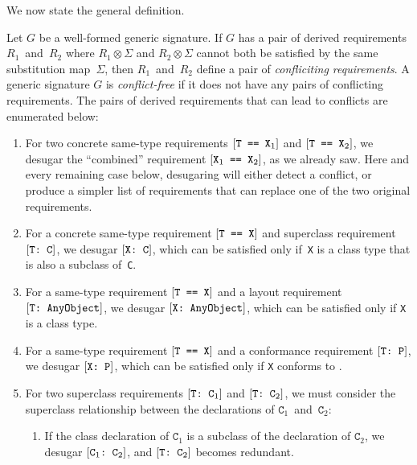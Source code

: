 \documentclass[../generics]{subfiles}
\begin{document}
We now state the general definition.

\begin{definition}\label{conflicting req def}
Let $G$ be a well-formed generic signature. If $G$ has a pair of derived requirements $R_1$~and~$R_2$ where $R_1\otimes\Sigma$ and $R_2\otimes\Sigma$ cannot both be satisfied by the same substitution map~$\Sigma$, then $R_1$~and~$R_2$ define a pair of \emph{confliciting requirements}. A generic signature $G$ is \emph{conflict-free} if it does not have any pairs of conflicting requirements. The pairs of derived requirements that can lead to conflicts are enumerated below:
\begin{enumerate}
\item For two concrete same-type requirements $[\texttt{T == $\texttt{X}_1$}]$ and $[\texttt{T == $\texttt{X}_2$}]$, we desugar the ``combined'' requirement $[\texttt{$\texttt{X}_1$ == $\texttt{X}_2$}]$, as we already saw. Here and every remaining case below, desugaring will either detect a conflict, or produce a simpler list of requirements that can replace one of the two original requirements.
\item For a concrete same-type requirement $[\texttt{T == X}]$ and superclass requirement $[\texttt{T:~C}]$, we desugar $[\texttt{X:~C}]$, which can be satisfied only if~\texttt{X} is a class type that is also a subclass of~\texttt{C}.
\item For a same-type requirement $[\texttt{T == X}]$ and a layout requirement $[\texttt{T:~AnyObject}]$, we desugar $[\texttt{X:~AnyObject}]$, which can be satisfied only if \texttt{X} is a class type.
\item For a same-type requirement $[\texttt{T == X}]$ and a conformance requirement $[\texttt{T:~P}]$, we desugar $[\texttt{X:~P}]$, which can be satisfied only if \texttt{X} conforms to \tP.
\item For two superclass requirements $[\texttt{T:~$\texttt{C}_1$}]$ and $[\texttt{T:~$\texttt{C}_2$}]$, we must consider the superclass relationship between the declarations of $\texttt{C}_1$~and~$\texttt{C}_2$:
\begin{enumerate}
\item If the class declaration of $\texttt{C}_1$ is a subclass of the declaration of $\texttt{C}_2$, we desugar $[\texttt{$\texttt{C}_1$:~$\texttt{C}_2$}]$, and $[\texttt{T:~$\texttt{C}_2$}]$ becomes redundant.

\end{enumerate}
\end{enumerate}
\end{definition}
\end{document}
